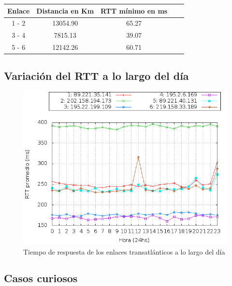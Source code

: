\noindent \begin{center} \begin{tabular}{| c | c | c | c | c |} \hline 
Enlace 	 &	Distancia en Km 	& 	RTT mínimo en ms	\\ \hline 
1 - 2	 &	13054.90 	 		& 	65.27				\\ \hline 
3 - 4 	 & 	7815.13	 			& 	39.07				\\ \hline 
5 - 6 	 & 	12142.26 			&	60.71				\\ \hline 
\end{tabular} \end{center}

\subsection{Variación del RTT a lo largo del día}

\begin{figure}[H]
\begin{center}
\includegraphics[width=17cm]{rtts.png}
\end{center}
\caption{Tiempo de respuesta de los enlaces transatlánticos a lo largo del día} \label{figura1}
\end{figure}

\subsection{Casos curiosos}

